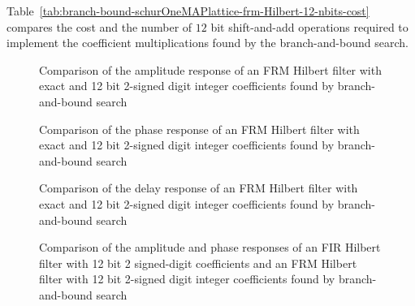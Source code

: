 \documentclass[a4paper,twoside,10pt,english]{report}
\begin{document}
Table~\ref{tab:branch-bound-schurOneMAPlattice-frm-Hilbert-12-nbits-cost}
compares the cost and the number of $12$ bit shift-and-add operations required
to implement the coefficient multiplications found by the branch-and-bound
search.
\begin{figure}[!htbp]
\begin{center}
\scalebox{0.7}{}
\caption{Comparison of the amplitude response of an FRM Hilbert filter with
  exact and 12 bit 2-signed digit integer coefficients found by branch-and-bound search}
\label{fig:branch-bound-schurOneMAPlattice-frm-Hilbert-12-nbits-A}
\end{center}
\end{figure}
\begin{figure}[!htbp]
\begin{center}
\scalebox{0.7}{}
\caption{Comparison of the phase response of an FRM Hilbert filter with
  exact and 12 bit 2-signed digit integer coefficients found by branch-and-bound search}
\label{fig:branch-bound-schurOneMAPlattice-frm-Hilbert-12-nbits-P}
\end{center}
\end{figure}
\begin{figure}[!htbp]
\begin{center}
\scalebox{0.7}{}
\caption{Comparison of the delay response of an FRM Hilbert filter with
  exact and 12 bit 2-signed digit integer coefficients found by branch-and-bound search}
\label{fig:branch-bound-schurOneMAPlattice-frm-Hilbert-12-nbits-T}
\end{center}
\end{figure}
\begin{figure}[!htbp]
\begin{center}
\scalebox{0.7}{}
\caption{Comparison of the amplitude and phase responses of an FIR Hilbert filter with 12 bit 2 signed-digit coefficients and an FRM Hilbert filter with
12 bit 2-signed digit integer coefficients found by branch-and-bound search}
\label{fig:branch-bound-schurOneMAPlattice-frm-Hilbert-12-nbits-remez}
\end{center}
\end{figure}
\end{document}
